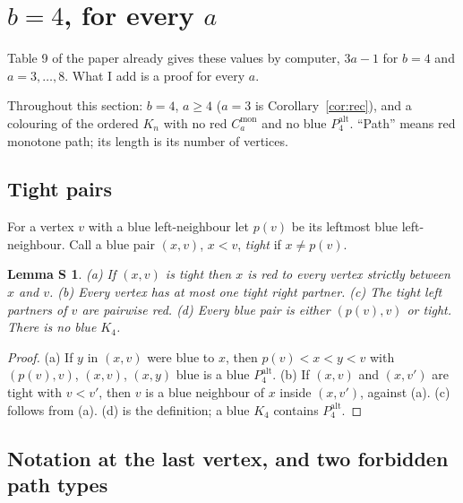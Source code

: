 \documentclass[11pt]{article}
\newcommand{\Cmon}[1]{C_{#1}^{\mathrm{mon}}}
\newcommand{\Palt}[1]{P_{#1}^{\mathrm{alt}}}
\theoremstyle{plain}
\newtheorem*{lemmaS}{Lemma S}
\theoremstyle{remark}
\begin{document}
\section{$b = 4$, for every $a$}

Table 9 of the paper already gives these values by computer, $3a-1$ for $b = 4$ and $a = 3, \dots, 8$. What I add
is a proof for every $a$.

Throughout this section: $b = 4$, $a \geq 4$ ($a = 3$ is Corollary~\ref{cor:rec}), and a colouring of the ordered
$K_n$ with no red $\Cmon{a}$ and no blue $\Palt{4}$. ``Path'' means red monotone path; its length is its number of
vertices.

\subsection{Tight pairs}

For a vertex $v$ with a blue left-neighbour let $p(v)$ be its leftmost blue left-neighbour. Call a blue pair
$(x, v)$, $x < v$, \emph{tight} if $x \neq p(v)$.

\begin{lemmaS}
(a) If $(x, v)$ is tight then $x$ is red to every vertex strictly between $x$ and $v$.
(b) Every vertex has at most one tight right partner.
(c) The tight left partners of $v$ are pairwise red.
(d) Every blue pair is either $(p(v), v)$ or tight. There is no blue $K_4$.
\end{lemmaS}

\begin{proof}
(a) If $y$ in $(x, v)$ were blue to $x$, then $p(v) < x < y < v$ with $(p(v), v)$, $(x, v)$, $(x, y)$ blue is a
blue $\Palt{4}$. (b) If $(x, v)$ and $(x, v')$ are tight with $v < v'$, then $v$ is a blue neighbour of $x$ inside
$(x, v')$, against (a). (c) follows from (a). (d) is the definition; a blue $K_4$ contains $\Palt{4}$.
\end{proof}

\subsection{Notation at the last vertex, and two forbidden path types}
\end{document}
